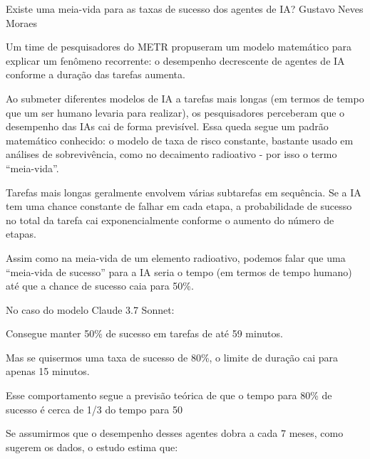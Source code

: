 \hypearticle
{Existe uma meia-vida para as taxas de sucesso dos agentes de IA?}
{Gustavo Neves Moraes}
{

\hspace*{1.5em} Um time de pesquisadores do METR propuseram um modelo matemático para explicar um fenômeno recorrente: o desempenho decrescente de agentes de IA conforme a duração das tarefas aumenta.

\subtitle{Objeto de Estudo}

\hspace*{1.5em} Ao submeter diferentes modelos de IA a tarefas mais longas (em termos de tempo que um ser humano levaria para realizar), os pesquisadores perceberam que o desempenho das IAs cai de forma previsível. Essa queda segue um padrão matemático conhecido: o modelo de taxa de risco constante, bastante usado em análises de sobrevivência, como no decaimento radioativo - por isso o termo “meia-vida”.

\subtitle{A lógica por trás da queda}

Tarefas mais longas geralmente envolvem várias subtarefas em sequência. Se a IA tem uma chance constante de falhar em
cada etapa, a probabilidade de sucesso no
total da tarefa cai exponencialmente
conforme o aumento do número de etapas.


Assim como na meia-vida de um
elemento radioativo, podemos falar que uma
“meia-vida de sucesso” para a IA seria o
tempo (em termos de tempo humano) até
que a chance de sucesso caia para 50\%.

\subtitle{Exemplo prático}

No caso do modelo Claude 3.7 Sonnet:

\begin{hypeitemize}
    
\item Consegue manter  50\% de sucesso em tarefas de até 59 minutos.
\item Mas se quisermos uma taxa de sucesso de 80\%, o limite de duração cai para apenas 15 minutos.
\item Esse comportamento segue a previsão teórica de que o tempo para 80\% de sucesso é cerca de 1/3 do tempo para 50%
\end{hypeitemize}

\subtitle{Previsão futura: Quanto tempo até melhorar?}
\hspace*{1.5em} Se assumirmos que o desempenho
desses agentes dobra a cada 7 meses, como
sugerem os dados, o estudo estima que:

}
